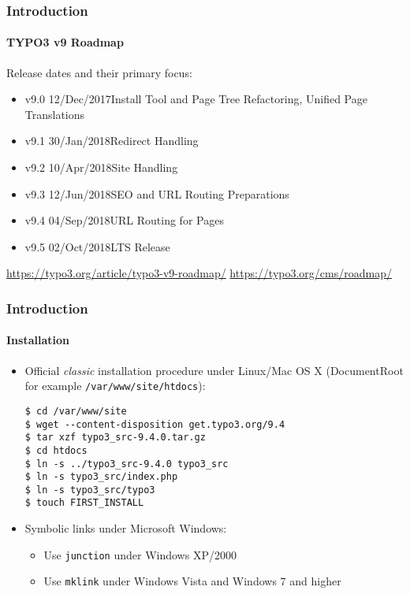 
\begin{frame}[fragile]
	\frametitle{Introduction}
	\framesubtitle{TYPO3 v9 Roadmap}

	Release dates and their primary focus:

	\begin{itemize}

		\item v9.0 \tabto{1.1cm}12/Dec/2017\tabto{3.4cm}Install Tool and Page Tree Refactoring,\newline
			\tabto{3.4cm}Unified Page Translations
		\item v9.1 \tabto{1.1cm}30/Jan/2018\tabto{3.4cm}Redirect Handling
		\item v9.2 \tabto{1.1cm}10/Apr/2018\tabto{3.4cm}Site Handling
        \item v9.3 \tabto{1.1cm}12/Jun/2018\tabto{3.4cm}SEO and URL Routing Preparations
		\item
			\begingroup
				\color{typo3orange}
                    v9.4 \tabto{1.1cm}04/Sep/2018\tabto{3.4cm}URL Routing for Pages
			\endgroup
		\item v9.5 \tabto{1.1cm}02/Oct/2018\tabto{3.4cm}LTS Release

	\end{itemize}

	\smaller
		\url{https://typo3.org/article/typo3-v9-roadmap/}\newline
		\url{https://typo3.org/cms/roadmap/}
	\normalsize

\end{frame}


\begin{frame}[fragile]
	\frametitle{Introduction}
	\framesubtitle{Installation}

	\begin{itemize}
		\item Official \textit{classic} installation procedure under Linux/Mac OS X\newline
			(DocumentRoot for example \texttt{/var/www/site/htdocs}):
		\begin{lstlisting}
$ cd /var/www/site
$ wget --content-disposition get.typo3.org/9.4
$ tar xzf typo3_src-9.4.0.tar.gz
$ cd htdocs
$ ln -s ../typo3_src-9.4.0 typo3_src
$ ln -s typo3_src/index.php
$ ln -s typo3_src/typo3
$ touch FIRST_INSTALL
		\end{lstlisting}

		\item Symbolic links under Microsoft Windows:

			\begin{itemize}
				\item Use \texttt{junction} under Windows XP/2000
				\item Use \texttt{mklink} under Windows Vista and Windows 7 and higher
			\end{itemize}

	\end{itemize}
\end{frame}

